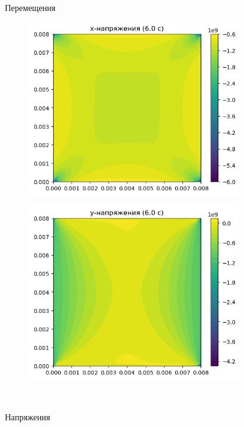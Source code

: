 \documentclass[12pt, a4paper]{article}
\begin{document}
\begin{figure}[H]
\begin{subfigure}[H]{0.38\textwidth}
	\end{subfigure}	
	\\[0.2cm]
	\caption{Перемещения}
	\begin{subfigure}[H]{0.38\textwidth}
		\includegraphics[width=\textwidth]{stressx_6c}
	\end{subfigure}
	\qquad\qquad
	\begin{subfigure}[H]{0.38\textwidth}
		\includegraphics[width=\textwidth]{stressy_6c}
	\end{subfigure}	
	\\[0.2cm]
	\caption{Напряжения}
\end{figure}	
 
\end{document}
